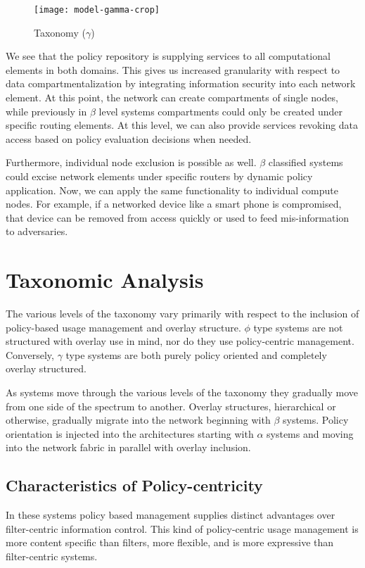 \begin{figure}[!t]
\centering
\texttt{[image: model-gamma-crop]}
\caption{Taxonomy ($\gamma$)}
\label{fig:model:taxonomy-gamma}
\end{figure}

We see that the policy repository is supplying services to all computational elements in both domains.  This gives us increased granularity with respect to data compartmentalization by integrating information security into each network element.  At this point, the network can create compartments of single nodes, while previously in $\beta$ level systems compartments could only be created under specific routing elements.  At this level, we can also provide services revoking data access based on policy evaluation decisions when needed.

Furthermore, individual node exclusion is possible as well. $\beta$ classified systems could excise network elements under specific routers by dynamic policy application.  Now, we can apply the same functionality to individual compute nodes.  For example, if a networked device like a smart phone is compromised, that device can be removed from access quickly or used to feed mis-information to adversaries.

\section{Taxonomic Analysis}
The various levels of the taxonomy vary primarily with respect to the inclusion of policy-based usage management and overlay structure.  $\phi$ type systems are not structured with overlay use in mind, nor do they use policy-centric management.  Conversely, $\gamma$ type systems are both purely policy oriented and completely overlay structured.

As systems move through the various levels of the taxonomy they gradually move from one side of the spectrum to another.  Overlay structures, hierarchical or otherwise, gradually migrate into the network beginning with $\beta$ systems.  Policy orientation is injected into the architectures starting with $\alpha$ systems and moving into the network fabric in parallel with overlay inclusion.

\subsection{Characteristics of Policy-centricity}
In these systems policy based management supplies distinct advantages over filter-centric information control.  This kind of policy-centric usage management is more content specific than filters, more flexible, and is more expressive than filter-centric systems.

